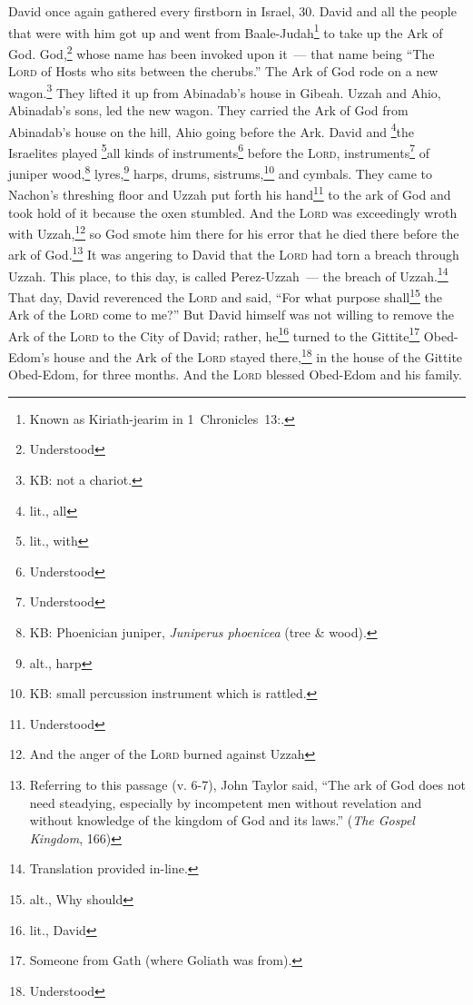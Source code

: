 
\begin{inparaenum}
     David once again gathered every firstborn in Israel, 30.%
     David and all the people that were with him got up and went from Baale-Judah\footnote{Known as Kiriath-jearim in 1~Chronicles~13\thinspace:.} to take up the Ark of God. God,\footnote{Understood} whose name has been invoked upon it~--- that name being ``The \textsc{Lord} of Hosts who sits between the cherubs.''%
     The Ark of God rode on a new wagon.\footnote{KB: not a chariot.} They lifted it up from Abinadab's house in Gibeah. Uzzah and Ahio, Abinadab's sons, led the new wagon.%
     They carried the Ark of God from Abinadab's house on the hill, Ahio going before the Ark.%
     David and \footnote{lit., all}the Israelites played \footnote{lit., with}all kinds of instruments\footnote{Understood} before the \textsc{Lord}, instruments\footnote{Understood} of juniper wood,\footnote{KB: Phoenician juniper, \textit{Juniperus phoenicea} (tree \& wood).} lyres,\footnote{alt., harp} harps, drums, sistrums,\footnote{KB: small percussion instrument which is rattled.} and cymbals.%
     They came to Nachon's threshing floor and Uzzah put forth his hand\footnote{Understood} to the ark of God and took hold of it because the oxen stumbled.%
     And the \textsc{Lord} was exceedingly wroth with Uzzah,\footnote{And the anger of the \textsc{Lord} burned against Uzzah} so God smote him there for his error that he died there before the ark of God.\footnote{Referring to this passage (v. 6-7), John Taylor said, ``The ark of God does not need steadying, especially by incompetent men without revelation and without knowledge of the kingdom of God and its laws.'' (\textit{The Gospel Kingdom}, 166)}%
     It was angering to David that the \textsc{Lord} had torn a breach through Uzzah. This place, to this day, is called Perez-Uzzah~--- the breach of Uzzah.\footnote{Translation provided in-line.}%
     That day, David reverenced the \textsc{Lord} and said, ``For what purpose shall\footnote{alt., Why should} the Ark of the \textsc{Lord} come to me?''%
     But David himself was not willing to remove the Ark of the \textsc{Lord} to the City of David; rather, he\footnote{lit., David} turned to the Gittite\footnote{Someone from Gath (where Goliath was from).} Obed-Edom's house%
     and the Ark of the \textsc{Lord} stayed there,\footnote{Understood} in the house of the Gittite Obed-Edom, for three months. And the \textsc{Lord} blessed Obed-Edom and his family.%

\end{inparaenum}

